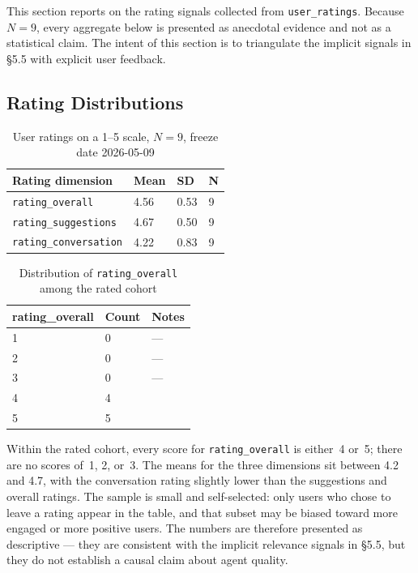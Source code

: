 This section reports on the rating signals collected from \texttt{user\_ratings}. Because $N = 9$, every aggregate below is presented as anecdotal evidence and not as a statistical claim. The intent of this section is to triangulate the implicit signals in §5.5 with explicit user feedback.

\subsection{Rating Distributions}
\label{subsec:rating_distributions}

\begin{table}[H]
\centering
\begin{tabular}{p{4cm}p{2cm}p{2cm}p{4cm}}
\toprule
\textbf{Rating dimension} & \textbf{Mean} & \textbf{SD} & \textbf{N}\\
\midrule
\texttt{rating\_overall}        & 4.56 & 0.53 & 9\\
\texttt{rating\_suggestions}    & 4.67 & 0.50 & 9\\
\texttt{rating\_conversation}   & 4.22 & 0.83 & 9\\
\bottomrule
\end{tabular}
\caption{User ratings on a 1--5 scale, $N=9$, freeze date 2026-05-09}
\label{tab:rating_distributions}
\end{table}

\begin{table}[H]
\centering
\begin{tabular}{p{3cm}p{2cm}p{6cm}}
\toprule
\textbf{rating\_overall} & \textbf{Count} & \textbf{Notes}\\
\midrule
1 & 0 & ---\\
2 & 0 & ---\\
3 & 0 & ---\\
4 & 4 & \\
5 & 5 & \\
\bottomrule
\end{tabular}
\caption{Distribution of \texttt{rating\_overall} among the rated cohort}
\label{tab:rating_overall_distribution}
\end{table}

Within the rated cohort, every score for \texttt{rating\_overall} is either~4 or~5; there are no scores of~1, 2, or~3. The means for the three dimensions sit between 4.2 and 4.7, with the conversation rating slightly lower than the suggestions and overall ratings. The sample is small and self-selected: only users who chose to leave a rating appear in the table, and that subset may be biased toward more engaged or more positive users. The numbers are therefore presented as descriptive --- they are consistent with the implicit relevance signals in §5.5, but they do not establish a causal claim about agent quality.

